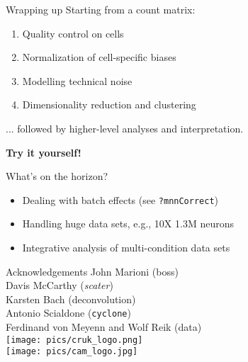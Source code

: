 \documentclass{beamer}
\begin{document}
\begin{frame}{Wrapping up}
    Starting from a count matrix:\\[0.1em]
    \begin{enumerate}
        \setlength\itemsep{0.5em}
        \item Quality control on cells 
        \item Normalization of cell-specific biases
        \item Modelling technical noise
        \item Dimensionality reduction and clustering
    \end{enumerate}
    ... followed by higher-level analyses and interpretation. \\[0.2in]
    \begin{center}
    \textbf{Try it yourself!}
\end{center}
\begin{block}{What's on the horizon?}
    \begin{itemize}
        \item Dealing with batch effects (see \texttt{?mnnCorrect})
        \item Handling huge data sets, e.g., 10X 1.3M neurons
        \item Integrative analysis of multi-condition data sets
    \end{itemize}
           
\end{block}
\end{frame}

\begin{frame}{Acknowledgements}
John Marioni (boss) \\
Davis McCarthy (\textit{scater}) \\
Karsten Bach (deconvolution) \\
Antonio Scialdone (\texttt{cyclone}) \\
Ferdinand von Meyenn and Wolf Reik (data) \\[0.2in]
\texttt{[image: pics/cruk\_logo.png]} \\[0.1in]
\texttt{[image: pics/cam\_logo.jpg]} 
\end{frame}
\end{document}
